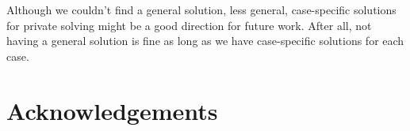 \documentclass[
    9pt,            %
    report,        %
    affiltop,       %
]{art}
\begin{document}
Although we couldn't find a general solution, less general, case-specific solutions for private solving might be a good direction for future work. After all, not having a general solution is fine as long as we have case-specific solutions for each case.

\section*{Acknowledgements}


\nocite{*}

\end{document}
